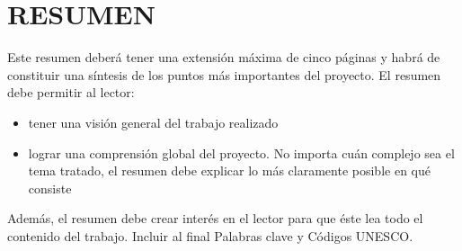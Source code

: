 \documentclass[a4paper, 11pt, spanish, twoside]{article}
\begin{document}
\newpage
\section*{RESUMEN} %

Este resumen deberá tener una extensión máxima de cinco páginas y habrá de constituir una síntesis de los puntos más importantes del proyecto. El resumen debe permitir al lector: 
\begin{itemize}
    \item tener una visión general del trabajo realizado
    \item lograr una comprensión global del proyecto. No importa cuán complejo sea el tema tratado, el resumen debe explicar lo más claramente posible en qué consiste
\end{itemize}

Además, el resumen debe crear interés en el lector para que éste lea todo el contenido del trabajo. Incluir al final Palabras clave y Códigos UNESCO.

\afterpage{\blankpage} %


\newpage
\renewcommand*\contentsname{ÍNDICE} %
\tableofcontents %
\afterpage{\blankpage} %
\end{document}
